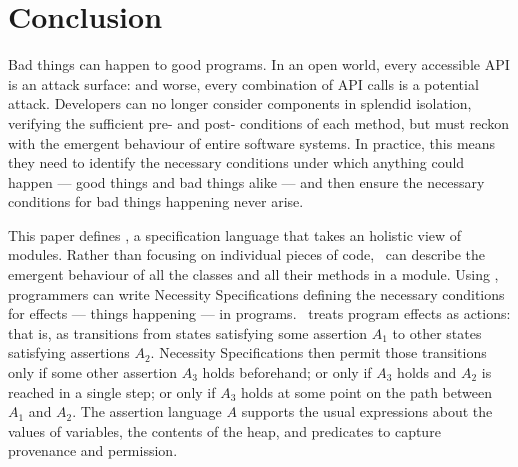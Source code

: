 \section{Conclusion}
\label{s:conclusion}

Bad things can happen to good programs. In an open world, every
accessible API is an attack surface: and worse, every combination of
API calls is a potential attack.  Developers can no longer consider
components in splendid isolation, verifying the sufficient pre- and
post- conditions of each method, but must reckon with the emergent
behaviour of entire software systems. In practice, this means they
need to identify the necessary conditions under which anything could
happen\cite{anything} --- good things and bad things alike --- and
then ensure the necessary conditions for bad things happening never arise.



This paper defines \Chainmail, a specification language that takes an
holistic view of modules. Rather than focusing on individual pieces
of code, \Chainmail\ can describe the emergent behaviour of all the
classes and all their methods in a module.
Using \Chainmail,
programmers can write Necessity Specifications defining the necessary
conditions for effects --- things happening --- in programs.
\Chainmail\ treats program effects as actions:
that is, as transitions from states satisfying some assertion 
$A_1$ to other states satisfying assertions $A_2$. 
Necessity Specifications then permit those transitions
only if some other assertion $A_3$ holds beforehand;
or only if $A_3$ holds and $A_2$ is reached in a single step;
or only if $A_3$ holds at some point on the path between
$A_1$ and $A_2$.
The assertion language $A$ supports the usual expressions about the
values of variables, the contents of the heap, and predicates
to capture provenance and permission.



